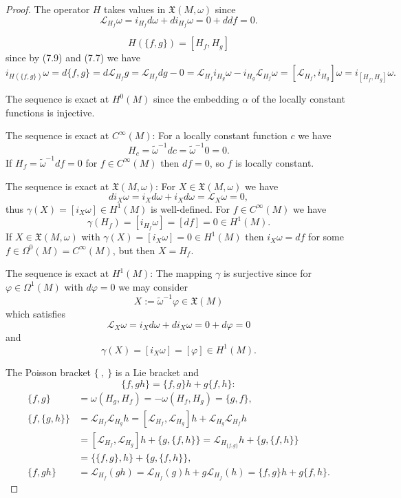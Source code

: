 \documentclass{article}
\theoremstyle{definition}
\begin{document}
\begin{proof}
    The operator $H$ takes values in $\mathfrak{X}(M, \omega)$ since
    \[
    \mathcal{L}_{H_f} \omega = i_{H_f} d\omega + d i_{H_f} \omega = 0 + d df = 0.
    \]

    \[
    H(\{f, g\}) = [H_f, H_g] 
    \]
    since by (7.9) and (7.7) we have
    \begin{equation}
    i_{H(\{f, g\})} \omega = d\{f, g\} = d \mathcal{L}_{H_f} g = \mathcal{L}_{H_f} dg - 0 = \mathcal{L}_{H_f} i_{H_g} \omega - i_{H_g} \mathcal{L}_{H_f} \omega
    = [\mathcal{L}_{H_f}, i_{H_g}] \omega = i_{[H_f, H_g]} \omega.
    \end{equation}

    The sequence is exact at $H^0(M)$ since the embedding $\alpha$ of the locally constant functions is injective.

    The sequence is exact at $C^\infty(M)$: For a locally constant function $c$ we have 
    \[
    H_c = \tilde{\omega}^{-1} dc = \tilde{\omega}^{-1} 0 = 0.
    \]
    If $H_f = \tilde{\omega}^{-1} df = 0$ for $f \in C^\infty(M)$ then $df = 0$, so $f$ is locally constant.

    The sequence is exact at $\mathfrak{X}(M, \omega)$: For $X \in \mathfrak{X}(M, \omega)$ we have 
    \[
    d i_X \omega = i_X d\omega + i_X d\omega = \mathcal{L}_X \omega = 0,
    \]
    thus $\gamma(X) = [i_X \omega] \in H^1(M)$ is well-defined. For $f \in C^\infty(M)$ we have 
    \[
    \gamma(H_f) = [i_{H_f} \omega] = [df] = 0 \in H^1(M).
    \]
    If $X \in \mathfrak{X}(M, \omega)$ with $\gamma(X) = [i_X \omega] = 0 \in H^1(M)$ then $i_X \omega = df$ for some $f \in \Omega^0(M) = C^\infty(M)$, but then $X = H_f$.

    The sequence is exact at $H^1(M)$: The mapping $\gamma$ is surjective since for $\varphi \in \Omega^1(M)$ with $d\varphi = 0$ we may consider 
    \[
    X := \tilde{\omega}^{-1} \varphi \in \mathfrak{X}(M)
    \]
    which satisfies 
    \[
    \mathcal{L}_X \omega = i_X d\omega + d i_X \omega = 0 + d\varphi = 0
    \]
    and 
    \[
    \gamma(X) = [i_X \omega] = [\varphi] \in H^1(M).
    \]

    The Poisson bracket $\{ \ , \ \}$ is a Lie bracket and 
    \[
    \{f, gh\} = \{f, g\}h + g\{f, h\}:
    \]
    \begin{align}
    \{f, g\} &= \omega(H_g, H_f) = -\omega(H_f, H_g) = \{g, f\}, \\
    \{f, \{g, h\}\} &= \mathcal{L}_{H_f} \mathcal{L}_{H_g} h = [\mathcal{L}_{H_f}, \mathcal{L}_{H_g}] h + \mathcal{L}_{H_g} \mathcal{L}_{H_f} h \\
    &= [\mathcal{L}_{H_f}, \mathcal{L}_{H_g}] h + \{g, \{f, h\}\} = \mathcal{L}_{H_{\{f, g\}}} h + \{g, \{f, h\}\} \\
    &= \{\{f, g\}, h\} + \{g, \{f, h\}\}, \\
    \{f, gh\} &= \mathcal{L}_{H_f}(gh) = \mathcal{L}_{H_f}(g)h + g \mathcal{L}_{H_f}(h) = \{f, g\}h + g\{f, h\}.
    \end{align}


\end{proof}
\end{document}
